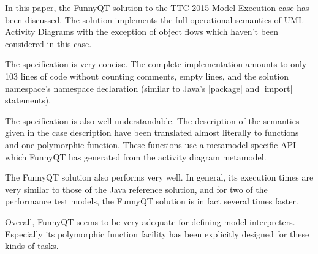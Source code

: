 \documentclass[submission]{eptcs}
\newcommand{\code}{\clojureinline}
\begin{document}
In this paper, the FunnyQT solution to the TTC 2015 Model Execution case has
been discussed.  The solution implements the full operational semantics of UML
Activity Diagrams with the exception of object flows which haven't been
considered in this case.

The specification is very concise.  The complete implementation amounts to only
103 lines of code without counting comments, empty lines, and the solution
namespace's namespace declaration (similar to Java's \code|package| and
\code|import| statements).

The specification is also well-understandable.  The description of the
semantics given in the case description have been translated almost literally
to functions and one polymorphic function.  These functions use a
metamodel-specific API which FunnyQT has generated from the activity diagram
metamodel.

The FunnyQT solution also performs very well.  In general, its execution times
are very similar to those of the Java reference solution, and for two of the
performance test models, the FunnyQT solution is in fact several times faster.

Overall, FunnyQT seems to be very adequate for defining model interpreters.
Especially its polymorphic function facility has been explicitly designed for
these kinds of tasks.



\end{document}
